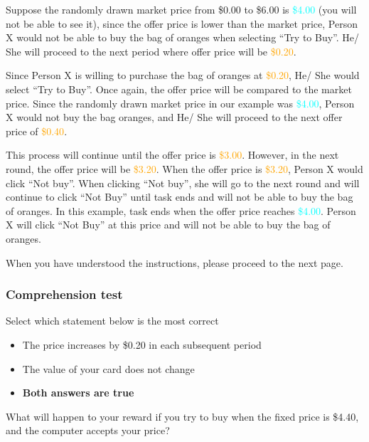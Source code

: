 \documentclass[12pt]{article}
\begin{document}
{Suppose the randomly drawn market price from \$0.00 to \$6.00 is \textcolor{cyan}{\$4.00} (you will not be able to see it), since the offer price is lower than the market price, Person X would not be able to buy the bag of oranges when selecting “Try to Buy”. He/ She will proceed to the next period where offer price will be \textcolor{orange}{\$0.20}.

Since Person X is willing to purchase the bag of oranges at \textcolor{orange}{\$0.20}, He/ She would select “Try to Buy”. Once again, the offer price will be compared to the market price. Since the randomly drawn market price in our example was \textcolor{cyan}{\$4.00}, Person X would not buy the bag oranges, and He/ She will proceed to the next offer price of \textcolor{orange}{\$0.40}.


This process will continue until the offer price is \textcolor{orange}{\$3.00}.  However, in the next round, the offer price will be \textcolor{orange}{\$3.20}. When the offer price is \textcolor{orange}{\$3.20}, Person X would click “Not buy”. When clicking “Not buy”, she will go to the next round and will continue to click “Not Buy” until task ends and will not be able to buy the bag of oranges. In this example, task ends when the offer price reaches \textcolor{cyan}{\$4.00}. Person X will click “Not Buy” at this price and will not be able to buy the bag of oranges.
\vspace{0.5cm}

When you have understood the instructions, please proceed to the next page.
\clearpage

\subsubsection*{Comprehension test}

Select which statement below is the most correct

\begin{itemize}
    \item The price increases by \$0.20 in each subsequent period 
    \item The value of your card does not change
    \item \textbf{Both answers are true}
\end{itemize}

\vspace{0.5cm}

What will happen to your reward if you try to buy when the fixed price is \$4.40, and the computer accepts your price?

}
\end{document}

